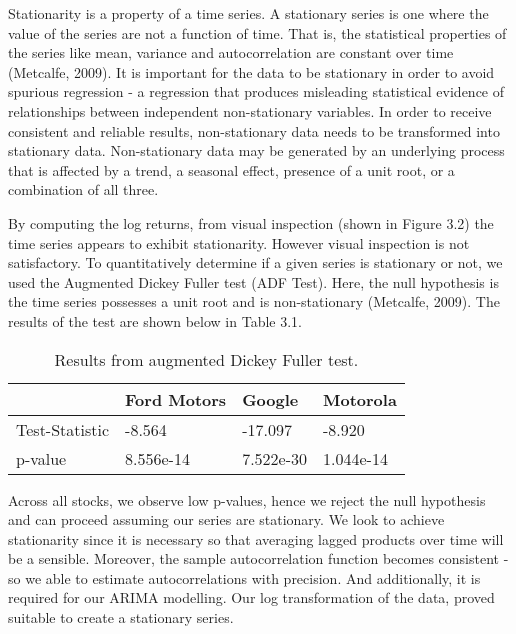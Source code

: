 Stationarity is a property of a time series. A stationary series is one where the value of the series are not a function of time. That is, the statistical properties of the series like mean, variance and autocorrelation are constant over time (Metcalfe, 2009). It is important for the data to be stationary in order to avoid spurious regression - a regression that produces misleading statistical evidence of relationships between independent non-stationary variables. In order to receive consistent and reliable results, non-stationary data needs to be transformed into stationary data. Non-stationary data may be generated by an underlying process that is affected by a trend, a seasonal effect, presence of a unit root, or a combination of all three. 

By computing the log returns, from visual inspection (shown in Figure 3.2) the time series appears to exhibit stationarity. However visual inspection is not satisfactory. To quantitatively determine if a given series is stationary or not, we used the Augmented Dickey Fuller test (ADF Test). Here, the null hypothesis is the time series possesses a unit root and is non-stationary (Metcalfe, 2009). The results of the test are shown below in Table 3.1. 

\begin{table}[h]
\centering
\begin{tabular}{llll}
\toprule

               & Ford Motors & Google    & Motorola  \\
               \midrule

Test-Statistic & -8.564      & -17.097   & -8.920    \\
p-value        & 8.556e-14   & 7.522e-30 & 1.044e-14 \\
\bottomrule

\end{tabular}
\caption{Results from augmented Dickey Fuller test.}
\end{table}

Across all stocks, we observe low p-values, hence we reject the null hypothesis and can proceed assuming our series are stationary. We look to achieve stationarity since it is  necessary so that averaging lagged products over time will be a sensible. Moreover, the sample autocorrelation  function becomes consistent - so we able to estimate autocorrelations with precision. And additionally, it is required for our ARIMA modelling. Our log transformation of the data, proved suitable to create a stationary series. 


